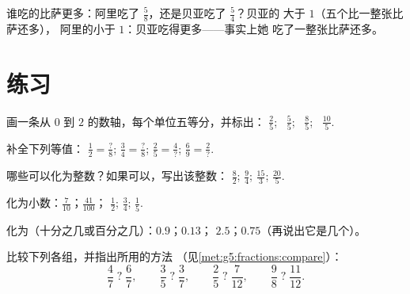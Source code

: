 \begin{example}\label{ex:g5:fractions:compare}
谁吃的比萨更多：阿里吃了 $\frac58$，还是贝亚吃了 $\frac54$？贝亚的
大于 $1$（五个比一整张比萨还多），
阿里的小于 $1$：贝亚吃得更多——事实上她
吃了一整张比萨还多。
\end{example}

\section{练习}

\begin{exercise}[$\star$]\label{exo:g5:fractions:1}
画一条从 $0$ 到 $2$ 的数轴，每个单位五等分，并标出：
$\frac25$; \ $\frac55$; \ $\frac85$; \ $\frac{10}{5}$.
\end{exercise}

\begin{exercise}[$\star$]\label{exo:g5:fractions:2}
补全下列等值：
$\frac12 = \frac{?}{8}$; \quad
$\frac34 = \frac{?}{8}$; \quad
$\frac{2}{5} = \frac{4}{?}$; \quad
$\frac{6}{9} = \frac{2}{?}$.
\end{exercise}

\begin{exercise}[$\star$]\label{exo:g5:fractions:3}
哪些可以化为整数？如果可以，写出该整数：
$\frac82$; \quad $\frac{9}{4}$; \quad $\frac{15}{3}$; \quad
$\frac{20}{5}$.
\end{exercise}

\begin{exercise}[$\star$]\label{exo:g5:fractions:4}
化为小数：$\frac{7}{10}$；\quad $\frac{41}{100}$；\quad
$\frac12$; \quad $\frac34$; \quad $\frac15$.
\end{exercise}

\begin{exercise}[$\star$]\label{exo:g5:fractions:5}
化为（十分之几或百分之几）：$0.9$；\quad $0.13$；
\quad $2.5$；\quad $0.75$（再说出它是几个）。
\end{exercise}

\begin{exercise}[$\star$]\label{exo:g5:fractions:6}
比较下列各组，并指出所用的方法
（见\cref{met:g5:fractions:compare}）：
\[
\frac47 \;?\; \frac67, \qquad
\frac35 \;?\; \frac37, \qquad
\frac25 \;?\; \frac{7}{12}, \qquad
\frac98 \;?\; \frac{11}{12} .
\]
\end{exercise}

